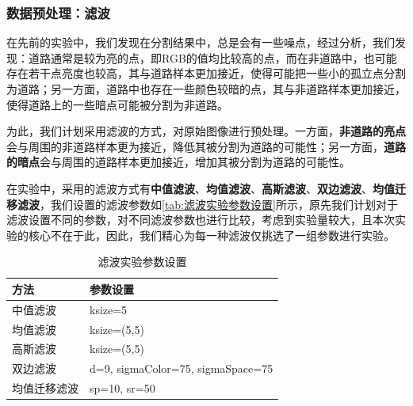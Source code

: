 \documentclass[12pt,hyperref,a4paper,UTF8]{ctexart}
\begin{document}
\subsubsection{数据预处理：滤波}
在先前的实验中，我们发现在分割结果中，总是会有一些噪点，经过分析，我们发现：道路通常是较为亮的点，即RGB的值均比较高的点，而在非道路中，也可能存在若干点亮度也较高，其与道路样本更加接近，使得可能把一些小的孤立点分割为道路；另一方面，道路中也存在一些颜色较暗的点，其与非道路样本更加接近，使得道路上的一些暗点可能被分割为非道路。
\par
为此，我们计划采用滤波的方式，对原始图像进行预处理。一方面，\textbf{非道路的亮点}会与周围的非道路样本更为接近，降低其被分割为道路的可能性；另一方面，\textbf{道路的暗点}会与周围的道路样本更加接近，增加其被分割为道路的可能性。
\par
在实验中，采用的滤波方式有\textbf{中值滤波}、\textbf{均值滤波}、\textbf{高斯滤波}、\textbf{双边滤波}、\textbf{均值迁移滤波}，我们设置的滤波参数如\autoref{tab:滤波实验参数设置}所示，原先我们计划对于滤波设置不同的参数，对不同滤波参数也进行比较，考虑到实验量较大，且本次实验的核心不在于此，因此，我们精心为每一种滤波仅挑选了一组参数进行实验。

\begin{table}[!htbp]

\caption{滤波实验参数设置}
    \centering
    \begin{tabular}{ll}
    \hline
        \textbf{方法} & \textbf{参数设置} \\
        \hline
        中值滤波  & ksize=5 \\
     	
        均值滤波 & ksize=(5,5) \\
        
        高斯滤波  & ksize=(5,5) \\
        
        双边滤波  & d=9, sigmaColor=75, sigmaSpace=75 \\
        
        均值迁移滤波  & sp=10, sr=50 \\
        \hline
    \end{tabular}
    \label{tab:滤波实验参数设置}
\end{table}
\end{document}
